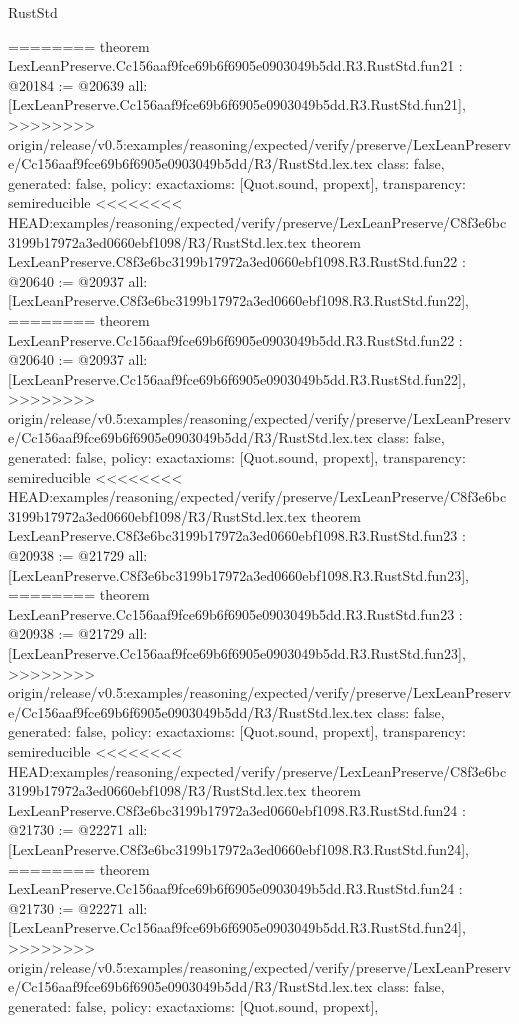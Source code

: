 \begin{lexlean}{RustStd}
\begin{coremodule}
{\begin{coremodule}
{{{{{{{{{{{{{{{{{{{{{{{{========
theorem LexLeanPreserve.Cc156aaf9fce69b6f6905e0903049b5dd.R3.RustStd.fun21 : @20184 := @20639 {
  all: [LexLeanPreserve.Cc156aaf9fce69b6f6905e0903049b5dd.R3.RustStd.fun21],
>>>>>>>> origin/release/v0.5:examples/reasoning/expected/verify/preserve/LexLeanPreserve/Cc156aaf9fce69b6f6905e0903049b5dd/R3/RustStd.lex.tex
  class: false,
  generated: false,
  policy: exact{axioms: [Quot.sound, propext]},
  transparency: semireducible
}
<<<<<<<< HEAD:examples/reasoning/expected/verify/preserve/LexLeanPreserve/C8f3e6bc3199b17972a3ed0660ebf1098/R3/RustStd.lex.tex
theorem LexLeanPreserve.C8f3e6bc3199b17972a3ed0660ebf1098.R3.RustStd.fun22 : @20640 := @20937 {
  all: [LexLeanPreserve.C8f3e6bc3199b17972a3ed0660ebf1098.R3.RustStd.fun22],
========
theorem LexLeanPreserve.Cc156aaf9fce69b6f6905e0903049b5dd.R3.RustStd.fun22 : @20640 := @20937 {
  all: [LexLeanPreserve.Cc156aaf9fce69b6f6905e0903049b5dd.R3.RustStd.fun22],
>>>>>>>> origin/release/v0.5:examples/reasoning/expected/verify/preserve/LexLeanPreserve/Cc156aaf9fce69b6f6905e0903049b5dd/R3/RustStd.lex.tex
  class: false,
  generated: false,
  policy: exact{axioms: [Quot.sound, propext]},
  transparency: semireducible
}
<<<<<<<< HEAD:examples/reasoning/expected/verify/preserve/LexLeanPreserve/C8f3e6bc3199b17972a3ed0660ebf1098/R3/RustStd.lex.tex
theorem LexLeanPreserve.C8f3e6bc3199b17972a3ed0660ebf1098.R3.RustStd.fun23 : @20938 := @21729 {
  all: [LexLeanPreserve.C8f3e6bc3199b17972a3ed0660ebf1098.R3.RustStd.fun23],
========
theorem LexLeanPreserve.Cc156aaf9fce69b6f6905e0903049b5dd.R3.RustStd.fun23 : @20938 := @21729 {
  all: [LexLeanPreserve.Cc156aaf9fce69b6f6905e0903049b5dd.R3.RustStd.fun23],
>>>>>>>> origin/release/v0.5:examples/reasoning/expected/verify/preserve/LexLeanPreserve/Cc156aaf9fce69b6f6905e0903049b5dd/R3/RustStd.lex.tex
  class: false,
  generated: false,
  policy: exact{axioms: [Quot.sound, propext]},
  transparency: semireducible
}
<<<<<<<< HEAD:examples/reasoning/expected/verify/preserve/LexLeanPreserve/C8f3e6bc3199b17972a3ed0660ebf1098/R3/RustStd.lex.tex
theorem LexLeanPreserve.C8f3e6bc3199b17972a3ed0660ebf1098.R3.RustStd.fun24 : @21730 := @22271 {
  all: [LexLeanPreserve.C8f3e6bc3199b17972a3ed0660ebf1098.R3.RustStd.fun24],
========
theorem LexLeanPreserve.Cc156aaf9fce69b6f6905e0903049b5dd.R3.RustStd.fun24 : @21730 := @22271 {
  all: [LexLeanPreserve.Cc156aaf9fce69b6f6905e0903049b5dd.R3.RustStd.fun24],
>>>>>>>> origin/release/v0.5:examples/reasoning/expected/verify/preserve/LexLeanPreserve/Cc156aaf9fce69b6f6905e0903049b5dd/R3/RustStd.lex.tex
  class: false,
  generated: false,
  policy: exact{axioms: [Quot.sound, propext]},
}}}}}}}}}}}}}}}}}}}}}}}}}}}}
\end{coremodule}}
\end{coremodule}
\end{lexlean}
